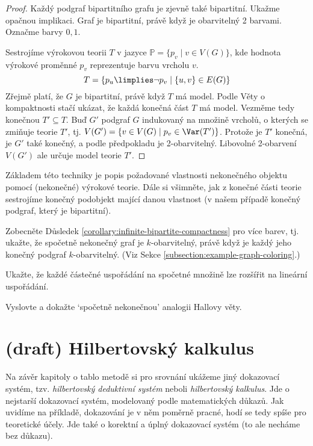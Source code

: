 \begin{proof}
    Každý podgraf bipartitního grafu je zjevně také bipartitní. Ukažme opačnou implikaci. Graf je bipartitní, právě když je obarvitelný 2 barvami. Označme barvy $0,1$.

    Sestrojíme výrokovou teorii $T$ v jazyce $\mathbb P=\{p_v\mid v\in V(G)\}$, kde hodnota výrokové proměnné $p_v$ reprezentuje barvu vrcholu $v$.
    $$  
        T=\{p_u\limplies\neg p_v\mid \{u,v\}\in E(G)\}
    $$
    Zřejmě platí, že $G$ je bipartitní, právě když $T$ má model. Podle Věty o kompaktnosti stačí ukázat, že každá konečná část $T$ má model. Vezměme tedy konečnou $T'\subseteq T$. Buď $G'$ podgraf $G$ indukovaný na množině vrcholů, o kterých se zmiňuje teorie $T'$, tj. $V(G')=\{v\in V(G)\mid p_v\in\Var(T')\}$. Protože je $T'$ konečná, je $G'$ také konečný, a podle předpokladu je 2-obarvitelný. Libovolné 2-obarvení $V(G')$ ale určuje model teorie $T'$.
\end{proof}

Základem této techniky je popis požadované vlastnosti nekonečného objektu pomocí (nekonečné) výrokové teorie. Dále si všimněte, jak z konečné části teorie sestrojíme konečný podobjekt mající danou vlastnost (v našem případě konečný podgraf, který je bipartitní).

\begin{exercise}
    Zobecněte Důsledek \ref{corollary:infinite-bipartite-compactness} pro více barev, tj. ukažte, že spočetně nekonečný graf je $k$-obarvitelný, právě když je každý jeho konečný podgraf $k$-obarvitelný. (Viz Sekce \ref{subsection:example-graph-coloring}.)
\end{exercise}

\begin{exercise}
    Ukažte, že každé částečné uspořádání na spočetné množině lze rozšířit na lineární uspořádání.
\end{exercise}

\begin{exercise}
    Vyslovte a dokažte `spočetně nekonečnou' analogii Hallovy věty.
\end{exercise}

\section{(draft) Hilbertovský kalkulus}\label{section:hilbert-calculus-propositional}
\todo
Na závěr kapitoly o tablo metodě si pro srovnání ukážeme jiný dokazovací systém, tzv. \emph{hilbertovský deduktivní systém} neboli \emph{hilbertovský kalkulus}. Jde o nejstarší dokazovací systém, modelovaný podle matematických důkazů. Jak uvidíme na příkladě, dokazování je v něm poměrně pracné, hodí se tedy spíše pro teoretické účely. Jde také o korektní a úplný dokazovací systém (to ale necháme bez důkazu).

